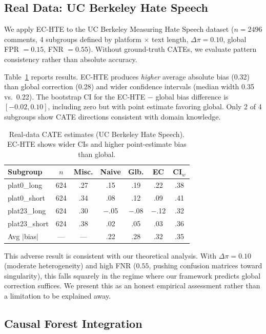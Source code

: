 \documentclass[11pt]{article}
\begin{document}
\subsection{Real Data: UC Berkeley Hate Speech}
\label{sec:exp-real}

We apply EC-HTE to the UC Berkeley Measuring Hate Speech dataset ($n{=}2496$ comments, 4 subgroups defined by platform $\times$ text length, $\Delta\pi = 0.10$, global FPR $= 0.15$, FNR $= 0.55$).
Without ground-truth CATEs, we evaluate pattern consistency rather than absolute accuracy.

Table~\ref{tab:real-data} reports results.
EC-HTE produces \emph{higher} average absolute bias (0.32) than global correction (0.28) and wider confidence intervals (median width 0.35 vs.\ 0.22).
The bootstrap CI for the EC-HTE $-$ global bias difference is $[-0.02, 0.10]$, including zero but with point estimate favoring global.
Only 2 of 4 subgroups show CATE directions consistent with domain knowledge.

\begin{table}[t]
\centering
\small
\caption{Real-data CATE estimates (UC Berkeley Hate Speech). EC-HTE shows wider CIs and higher point-estimate bias than global.}
\label{tab:real-data}
\begin{tabular}{@{}lcccccc@{}}
\toprule
Subgroup & $n$ & Misc. & Naive & Glb. & EC & CI$_w$ \\
\midrule
plat0\_long & 624 & .27 & .15 & .19 & .22 & .38 \\
plat0\_short & 624 & .34 & .08 & .12 & .09 & .41 \\
plat23\_long & 624 & .30 & $-$.05 & $-$.08 & $-$.12 & .32 \\
plat23\_short & 624 & .38 & .02 & .05 & .03 & .36 \\
\midrule
Avg $|$bias$|$ & --- & --- & .22 & .28 & .32 & .35 \\
\bottomrule
\end{tabular}
\end{table}

This adverse result is consistent with our theoretical analysis.
With $\Delta\pi = 0.10$ (moderate heterogeneity) and high FNR ($0.55$, pushing confusion matrices toward singularity), this falls squarely in the regime where our framework predicts global correction suffices.
We present this as an honest empirical assessment rather than a limitation to be explained away.

\subsection{Causal Forest Integration}
\label{sec:exp-causal-forest}
\end{document}

